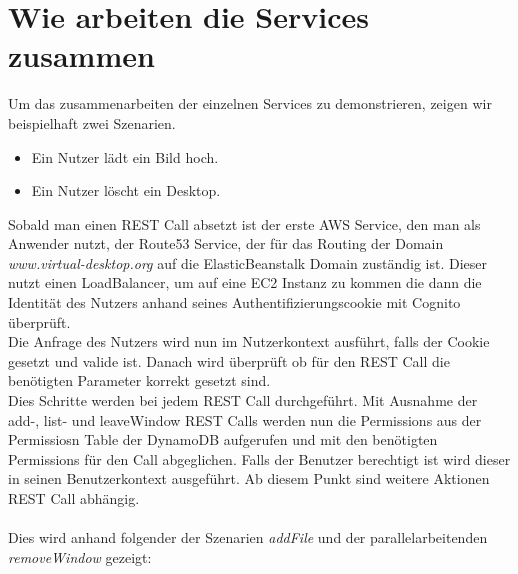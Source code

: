 \documentclass[a4paper, 12pt]{scrreprt}
\renewcommand\_{\textunderscore\allowbreak}
\begin{document}
\section{Wie arbeiten die Services zusammen}

Um das zusammenarbeiten der einzelnen Services zu demonstrieren, zeigen wir beispielhaft zwei Szenarien.
\begin{itemize}
\item Ein Nutzer lädt ein Bild hoch.
\item Ein Nutzer löscht ein Desktop.
\end{itemize}


Sobald man einen REST Call absetzt ist der erste AWS Service, den man als Anwender nutzt, der Route53 Service, der für das Routing der Domain \textit{www.virtual-desktop.org} auf die ElasticBeanstalk Domain zuständig ist. Dieser nutzt einen LoadBalancer, um auf eine EC2 Instanz zu kommen die dann die Identität des Nutzers anhand seines Authentifizierungscookie mit Cognito überprüft. \\
Die Anfrage des Nutzers wird nun im Nutzerkontext ausführt, falls der Cookie gesetzt und valide ist. Danach wird überprüft ob für den REST Call die benötigten Parameter korrekt gesetzt sind. \\
Dies Schritte werden bei jedem REST Call durchgeführt. Mit Ausnahme der add-, list- und leaveWindow REST Calls werden nun die Permissions aus der Permissiosn Table der DynamoDB aufgerufen und mit den benötigten Permissions für den Call abgeglichen. Falls der Benutzer berechtigt ist wird dieser in seinen Benutzerkontext ausgeführt. Ab diesem Punkt sind weitere Aktionen REST Call abhängig. \\ \\
Dies wird anhand folgender der Szenarien \textit{addFile} und der parallelarbeitenden \textit{removeWindow} gezeigt:
\end{document}
